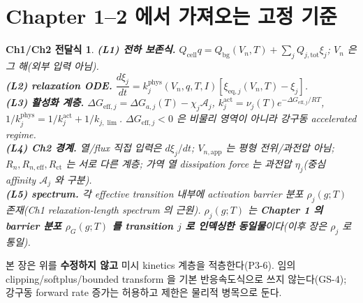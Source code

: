 \documentclass[11pt,a4paper]{article}
\newtheorem*{linkbox}{Ch1/Ch2 전달식}
\newcommand{\eff}{\mathrm{eff}}
\newcommand{\eq}{\mathrm{eq}}
\newcommand{\app}{\mathrm{app}}
\newcommand{\tot}{\mathrm{tot}}
\newcommand{\bg}{\mathrm{bg}}
\newcommand{\cell}{\mathrm{cell}}
\newcommand{\ct}{\mathrm{ct}}
\begin{document}
\section{Chapter 1--2 에서 가져오는 고정 기준}\label{sec:ch3_inherit}
\begin{linkbox}
\textbf{(L1) 전하 보존식.} $Q_\cell q=Q_\bg(V_n,T)+\sum_j Q_{j,\tot}\xi_j$; $V_n$ 은 그 해(외부 입력 아님).\\
\textbf{(L2) relaxation ODE.} $\dfrac{d\xi_j}{dt}=k_j^{\mathrm{phys}}(V_n,q,T,I)[\xi_{\eq,j}(V_n,T)-\xi_j]$.\\
\textbf{(L3) 활성화 계층.} $\Delta G_{\eff,j}=\Delta G_{a,j}(T)-\chi_j\mathcal A_j$,
$k_j^{\mathrm{act}}=\nu_j(T)e^{-\Delta G_{\eff,j}/RT}$, $1/k_j^{\mathrm{phys}}=1/k_j^{\mathrm{act}}+1/k_{j,\lim}$.
$\Delta G_{\eff,j}<0$ 은 비물리 영역이 아니라 강구동 accelerated regime.\\
\textbf{(L4) Ch2 경계.} 열/flux 직접 입력은 $d\xi_j/dt$; $V_{n,\app}$ 는 평형 전위/과전압 아님;
$R_n,R_{n,\eff},R_{\ct}$ 는 서로 다른 계층; 가역 열 dissipation force 는 과전압 $\eta_j$(중심 affinity
$\mathcal A_j$ 와 구분).\\
\textbf{(L5) spectrum.} 각 effective transition 내부에 activation barrier 분포 $\rho_j(g;T)$ 존재(Ch1
relaxation-length spectrum 의 근원). $\rho_j(g;T)$ 는 \textbf{Chapter 1 의 barrier 분포 $\rho_G(g;T)$ 를
transition $j$ 로 인덱싱한 동일물}이다(이후 장은 $\rho_j$ 로 통일).
\end{linkbox}
본 장은 위를 \textbf{수정하지 않고} 미시 kinetics 계층을 적층한다(P3-6). 임의 clipping/softplus/bounded
transform 을 기본 반응속도식으로 쓰지 않는다(GS-4); 강구동 forward rate 증가는 허용하고 제한은 물리적 병목으로 둔다.

\end{document}
